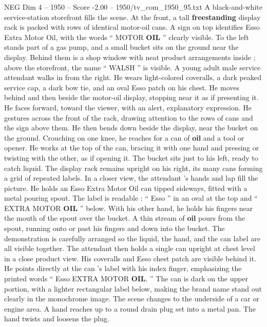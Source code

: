 \begin{textsample}{NEG Dim 4 – 1950 – Score -2.00 – 1950/tv\_com\_1950\_95.txt}  \label{ex:f4_neg_061}
A black-and-white service-station storefront fills the scene.
At the front, a tall \textbf{freestanding} display rack is packed with rows of identical motor-oil cans.
A sign on top identifies Esso Extra Motor Oil, with the words “ MOTOR \textbf{OIL} ” clearly visible.
To the left stands part of a gas pump, and a small bucket sits on the ground near the display.
Behind them is a shop window with neat product arrangements inside ; above the storefront, the name “ WALSH ” is visible.
A young adult male service attendant walks in from the right.
He wears light-colored coveralls, a dark peaked service cap, a dark bow tie, and an oval Esso patch on his chest.
He moves behind and then beside the motor-oil display, stopping near it as if presenting it.
He faces forward, toward the viewer, with an alert, explanatory expression.
He gestures across the front of the rack, drawing attention to the rows of cans and the sign above them.
He then bends down beside the display, near the bucket on the ground.
Crouching on one knee, he reaches for a can of \textbf{oil} and a tool or opener.
He works at the top of the can, bracing it with one hand and pressing or twisting with the other, as if opening it.
The bucket sits just to his left, ready to catch liquid.
The display rack remains upright on his right, its many cans forming a grid of repeated labels.
In a closer view, the attendant ’s hands and lap fill the picture.
He holds an Esso Extra Motor Oil can tipped sideways, fitted with a metal pouring spout.
The label is readable : “ Esso ” in an oval at the top and “ EXTRA MOTOR \textbf{OIL} ” below.
With his other hand, he holds his fingers near the mouth of the spout over the bucket.
A thin stream of \textbf{oil} pours from the spout, running onto or past his fingers and down into the bucket.
The demonstration is carefully arranged so the liquid, the hand, and the can label are all visible together.
The attendant then holds a single can upright at chest level in a close product view.
His coveralls and Esso chest patch are visible behind it.
He points directly at the can ’s label with his index finger, emphasizing the printed words “ Esso EXTRA MOTOR \textbf{OIL}. ” The can is dark on the upper portion, with a lighter rectangular label below, making the brand name stand out clearly in the monochrome image.
The scene changes to the underside of a car or engine area.
A hand reaches up to a round drain plug set into a metal pan.
The hand twists and loosens the plug.

\end{textsample}
